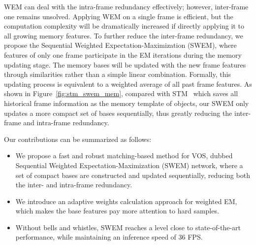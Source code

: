 WEM can deal with the intra-frame redundancy effectively; however, inter-frame one remains unsolved. Applying WEM on a single frame is efficient, but the computation complexity will be dramatically increased if directly applying it to all growing memory features. To further reduce the inter-frame redundancy, we propose the Sequential Weighted Expectation-Maximization (SWEM), where features of only one frame participate in the EM iterations during the memory updating stage. The memory bases will be updated with the new frame features through similarities rather than a simple linear combination. Formally, this updating process is equivalent to a weighted average of all past frame features. 
As shown in Figure~\ref{fig:stm_swem_mem}, 
compared with STM~\cite{Oh_2019_ICCV} which saves all historical frame information as the memory template of objects, our SWEM only updates a more compact set of bases sequentially, thus greatly reducing the inter-frame and intra-frame redundancy.

Our contributions can be summarized as follows:
\begin{itemize}
\item 
\vspace{-0.2cm}
We propose a fast and robust matching-based method for VOS, dubbed Sequential Weighted Expectation-Maximization (SWEM) network,
where a set of compact bases are constructed and updated sequentially, reducing both the inter- and intra-frame redundancy.
\item
\vspace{-0.2cm}
We introduce an adaptive weights calculation approach for weighted EM, which makes the base features pay more attention to hard samples.
\item
\vspace{-0.2cm}
 Without bells and whistles, SWEM reaches a level close to state-of-the-art performance, while maintaining an inference speed of 36 FPS.
\end{itemize}

